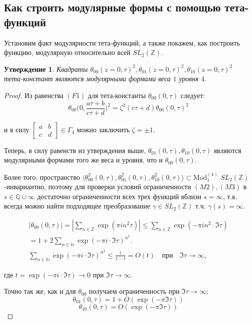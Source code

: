 \documentclass{article}
\newcommand{\ZZ}{\mathbb{Z}}
\newcommand{\NN}{\mathbb{N}}
\newcommand{\QQ}{\mathbb{Q}}
\theoremstyle{break}
\newtheorem{claim}{Утверждение}[section]
\newcommand{\ModkN}[2]{\text{Mod}_{#1}^{(#2)}}
\begin{document}
\subsection{Как строить модулярные формы с помощью тета-функций} 
Установим факт модулярности тета-функций, а также покажем, как построить функцию, модулярную относительно всей $SL_2(\ZZ)$.
\begin{claim}
	Квадраты $\theta_{00}(z=0, \tau)^2, \theta_{01}(z=0, \tau)^2, \theta_{10}(z=0, \tau)^2$ тета-констант являются модулярными формами веса $1$ уровня $4$.
\end{claim}
\begin{proof}
	Из равенства $(F1)$ для тета-константы $\theta_{00}(0, \tau)$ следует:
	\begin{equation}
		\theta_{00}\Big(0, \frac{a \tau + b}{c \tau + d}\Big)^2 =
		\zeta^2 (c\tau + d) \theta_{00}(0, \tau)^2
	\end{equation}
	
	и в силу $\begin{bmatrix}
		a & b \\ c & d
	\end{bmatrix} \in \Gamma_4$ можно заключить $\zeta=\pm 1$.

	
	Теперь, в силу равенств из утверждения выше, $\theta_{01}(0, \tau), \theta_{10}(0, \tau)$
	 являются модулярными формами того же веса и уровня, что и $\theta_{00}(0, \tau)$.
	 
	Более того, пространство 
	$\langle 
	\theta^2_{00}(0, \tau), \theta^2_{01}(0, \tau), \theta^2_{10}(0, \tau) \rangle
	\subset \ModkN{1}{4}
	$
	$SL_2(\ZZ)$-инвариантно, поэтому
	для проверки условий ограниченности $(M2),(M3)$ в $s \in \QQ \cup \infty$ достаточно ограниченности всех трех функций
	вблизи $s = \infty$, т.к. всегда можно найти подходящее преобразование 
	$\gamma \in SL_2(\ZZ)$ т.ч. $\gamma(s)=\infty$.
	
	\begin{gather*}
			|\theta_{00}(0, \tau)| = |\sum_{n \in \ZZ} \exp(\pi i n^2 \tau)|
			\le \sum_{n \in \ZZ} \exp(-\pi i n^2 \cdot \Im \tau) \\
			= 1 + 2 \sum_{n \in \NN} \exp(-\pi i \cdot \Im \tau) ^ {n^2}. \\
			\sum_{n \in \NN} \exp(-\pi i \cdot \Im \tau) ^ {n^2} \le \frac{t}{1-t} = O(t) \quad \text{при} \quad \Im \tau \to \infty,
	\end{gather*}

	где $t=\exp(-\pi i \cdot \Im \tau) \to 0$ при $\Im \tau \to \infty$.

	Точно так же, как и для $\theta_{00}$ получаем ограниченность при $\Im \tau \to \infty$:
	\begin{equation}
	\theta_{01}(0, \tau) = 1 + O(\exp(-\pi \Im \tau))
	\end{equation}
	\begin{equation}
		\theta_{10}(0, \tau) = O(\exp(-\pi \Im \tau))
	\end{equation}
\end{proof}
\end{document}
